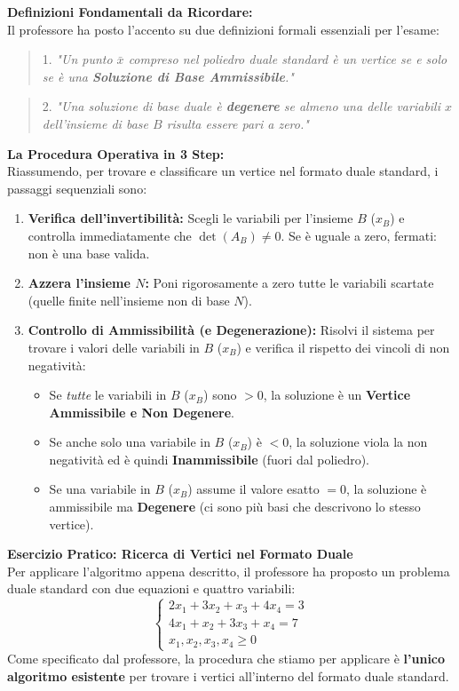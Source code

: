 \documentclass[12pt, a4paper]{article}
\begin{document}
	\vspace{0.4cm}
	\textbf{Definizioni Fondamentali da Ricordare:}\\
	Il professore ha posto l'accento su due definizioni formali essenziali per l'esame:
	\begin{quote}
		1. \textit{"Un punto $\bar{x}$ compreso nel poliedro duale standard è un vertice se e solo se è una \textbf{Soluzione di Base Ammissibile}."}
	\end{quote}
	\begin{quote}
		2. \textit{"Una soluzione di base duale è \textbf{degenere} se almeno una delle variabili $x$ dell'insieme di base $B$ risulta essere pari a zero."}
	\end{quote}
	
	\vspace{0.4cm}
	\textbf{La Procedura Operativa in 3 Step:}\\
	Riassumendo, per trovare e classificare un vertice nel formato duale standard, i passaggi sequenziali sono:
	\begin{enumerate}
		\item \textbf{Verifica dell'invertibilità:} Scegli le variabili per l'insieme $B$ ($x_B$) e controlla immediatamente che $\det(A_B) \neq 0$. Se è uguale a zero, fermati: non è una base valida.
		\item \textbf{Azzera l'insieme $N$:} Poni rigorosamente a zero tutte le variabili scartate (quelle finite nell'insieme non di base $N$).
		\item \textbf{Controllo di Ammissibilità (e Degenerazione):} Risolvi il sistema per trovare i valori delle variabili in $B$ ($x_B$) e verifica il rispetto dei vincoli di non negatività:
		\begin{itemize}
			\item Se \textit{tutte} le variabili in $B$ ($x_B$) sono $> 0$, la soluzione è un \textbf{Vertice Ammissibile e Non Degenere}.
			\item Se anche solo una variabile in $B$ ($x_B$) è $< 0$, la soluzione viola la non negatività ed è quindi \textbf{Inammissibile} (fuori dal poliedro).
			\item Se una variabile in $B$ ($x_B$) assume il valore esatto $= 0$, la soluzione è ammissibile ma \textbf{Degenere} (ci sono più basi che descrivono lo stesso vertice).
		\end{itemize}
	\end{enumerate}
	
	\vspace{0.6cm}
	\textbf{Esercizio Pratico: Ricerca di Vertici nel Formato Duale}\\
	Per applicare l'algoritmo appena descritto, il professore ha proposto un problema duale standard con due equazioni e quattro variabili:
	\[
	\begin{cases}
		2x_1 + 3x_2 + x_3 + 4x_4 = 3 \\
		4x_1 + x_2 + 3x_3 + x_4 = 7 \\
		x_1, x_2, x_3, x_4 \geq 0
	\end{cases}
	\]
	Come specificato dal professore, la procedura che stiamo per applicare è \textbf{l'unico algoritmo esistente} per trovare i vertici all'interno del formato duale standard.
	
\end{document}
